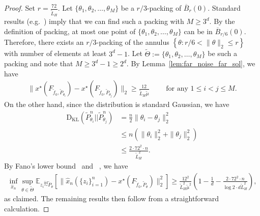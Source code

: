 \documentclass[11pt,twoside]{article}
\numberwithin{equation}{section}
\newcommand{\EE}{\mathbb{E}}
\newcommand{\1}{\mathbf{1}}
\theoremstyle{remark}
\theoremstyle{plain}
\begin{document}
\begin{proof}
	Set $r = \frac{72}{\tilde{L}_H}$. Let $\{\theta_1,\theta_2,\ldots, \theta_M\}$ be a $r/3$-packing of $\overline B_r(0)$. Standard results (e.g.~\cite[Lemma 5.7]{wainwright2019high}) imply that we can find such a packing with $M \ge 3^d$.  By the definition of packing, at most one point of $\{\theta_1,\theta_2,\ldots, \theta_M\}$ can be in $\overline B_{r/6}(0)$. Therefore, there exists an $r/3$-packing of the annulus 
	$\left\{\theta \colon r/6 <  \|\theta\|_2 \le  r \right\}$ with number of elements at least $3^d -1$.
	Let $ \tilde \Theta := \{\theta_1, \theta_2,\ldots, \theta_M\}$ be such a packing and note that $M \ge 3^d - 1 \ge 2^d$. 
	By Lemma~\ref{lem:far_noise_far_sol}, we have  
	\begin{align*}
		\|x^\star(F_{\tilde f_0, \tilde P_{\theta_i}}) - x^\star(F_{\tilde f_0, \tilde P_{\theta_j}})\|_2 \ge \frac{12}{\tilde L_H \tilde  \mu} \qquad \text{ for any $1\le i <j \le M$.}
	\end{align*}
	On the other hand, since the distribution is standard Gaussian, we have
	\begin{align*}
		\mathrm{D_{KL}}(\tilde P_{\theta_i}^n || \tilde P_{\theta_j}^n) &= \frac{n}{2} \|\theta_i - \theta_j\|_2^2 \\
		&\le n(\|\theta_i\|_2^2 +  \|\theta_j\|_2^2)\\
		&\le \frac{2\cdot 72^2 \cdot n}{\tilde L_H^2}.
	\end{align*}
	By Fano's lower bound~\cite[Proposition 15.12]{wainwright2019high} and ~\cite[Equation 15.34]{wainwright2019high}, we have 
	\begin{align*}
		\inf_{\widehat x_n} \sup_{\theta \in \tilde \Theta} \EE_{z_i\overset{\mathrm{iid}}{\sim} \tilde P_\theta}[\|\widehat x_n(\{z_i\}_{i=1}^{n}) - x^\star(F_{\tilde f_0, \tilde P_\theta})\|_2^2] \ge \frac{12^2}{ \tilde L_H^2 \tilde  \mu^2} \left(1- \frac{1}{d} - \frac{2\cdot 72^2 \cdot n}{\log 2 \cdot d\tilde L_H^2} \right),
	\end{align*}
	as claimed. The remaining results then follow from a straightforward calculation.
\end{proof}
\end{document}
